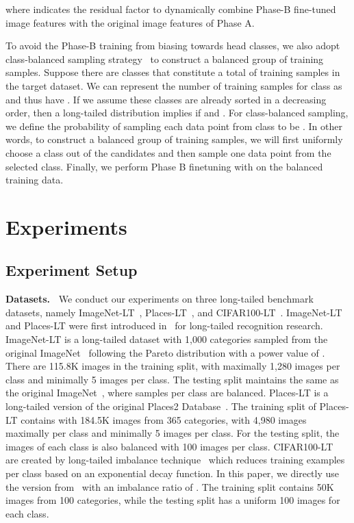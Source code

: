 \documentclass[10pt,twocolumn,letterpaper]{article}
\begin{document}
where  indicates the residual factor to dynamically combine Phase-B fine-tuned image features with the original image features of Phase A.

To avoid the Phase-B training from biasing towards head classes, we also adopt class-balanced sampling strategy~\cite{Kang2020Decoupling} to construct a balanced group of training samples. Suppose there are  classes that constitute a total of  training samples in the target dataset. We can represent the number of training samples for class  as  and thus have . If we assume these classes are already sorted in a decreasing order, then a long-tailed distribution implies  if  and . For class-balanced sampling, we define the probability of sampling each data point from class  to be . In other words, to construct a balanced group of training samples, we will first uniformly choose a class out of the  candidates and then sample one data point from the selected class. Finally, we perform Phase B finetuning with  on the balanced training data.

\section{Experiments}
\subsection{Experiment Setup}
\noindent\textbf{Datasets.~}
We conduct our experiments on three long-tailed benchmark datasets, namely ImageNet-LT~\cite{liu2019large}, Places-LT~\cite{liu2019large}, and CIFAR100-LT~\cite{cao2019learning}. ImageNet-LT and Places-LT were first introduced in~\cite{liu2019large} for long-tailed recognition research. ImageNet-LT is a long-tailed dataset with 1,000 categories sampled from the original ImageNet~\cite{deng2009imagenet} following the Pareto distribution with 
a power value of . There are 115.8K images in the training split, with maximally 1,280 images per class and minimally 5 images per class. The testing split maintains the same as the original ImageNet~\cite{deng2009imagenet}, where samples per class are balanced.
Places-LT is a long-tailed version of the original Places2 Database~\cite{zhou2017places}. The training split of  Places-LT contains with 184.5K images from 365 categories, with 4,980 images maximally per class and minimally 5 images per class. For the testing split, the images of each class is also balanced with 100 images per class. CIFAR100-LT~\cite{cao2019learning} are created by long-tailed imbalance technique~\cite{cui2019class} which reduces training examples per class based on an exponential decay function. In this paper, we directly use the version from~\cite{wang2021longtailed} with an imbalance ratio  of . The training split contains 50K images from 100 categories, while the testing split has a uniform 100 images for each class.
\end{document}
